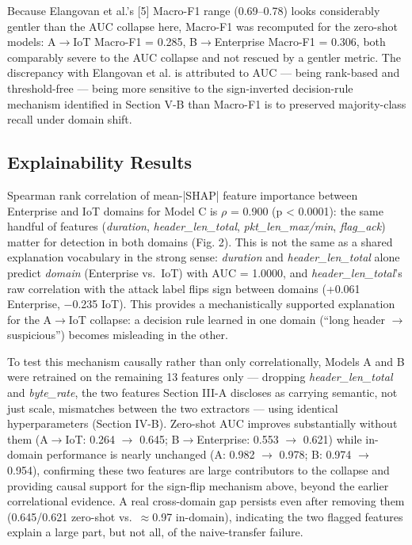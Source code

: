 \documentclass[conference]{IEEEtran}
\begin{document}
Because Elangovan et al.'s [5] Macro-F1 range (0.69--0.78) looks considerably gentler than the AUC collapse here, Macro-F1 was recomputed for the zero-shot models: A$\rightarrow$IoT Macro-F1 = 0.285, B$\rightarrow$Enterprise Macro-F1 = 0.306, both comparably severe to the AUC collapse and not rescued by a gentler metric. The discrepancy with Elangovan et al. is attributed to AUC --- being rank-based and threshold-free --- being more sensitive to the sign-inverted decision-rule mechanism identified in Section V-B than Macro-F1 is to preserved majority-class recall under domain shift.

\subsection{Explainability Results}

Spearman rank correlation of mean-|SHAP| feature importance between Enterprise and IoT domains for Model C is $\rho$ = 0.900 (p < 0.0001): the same handful of features (\textit{duration}, \textit{header\_len\_total}, \textit{pkt\_len\_max/min}, \textit{flag\_ack}) matter for detection in both domains (Fig. 2). This is not the same as a shared explanation vocabulary in the strong sense: \textit{duration} and \textit{header\_len\_total} alone predict \textit{domain} (Enterprise vs.~IoT) with AUC = 1.0000, and \textit{header\_len\_total}'s raw correlation with the attack label flips sign between domains (+0.061 Enterprise, $-$0.235 IoT). This provides a mechanistically supported explanation for the A$\rightarrow$IoT collapse: a decision rule learned in one domain (``long header $\rightarrow$ suspicious'') becomes misleading in the other.

To test this mechanism causally rather than only correlationally, Models A and B were retrained on the remaining 13 features only --- dropping \textit{header\_len\_total} and \textit{byte\_rate}, the two features Section III-A discloses as carrying semantic, not just scale, mismatches between the two extractors --- using identical hyperparameters (Section IV-B). Zero-shot AUC improves substantially without them (A$\rightarrow$IoT: 0.264 $\rightarrow$ 0.645; B$\rightarrow$Enterprise: 0.553 $\rightarrow$ 0.621) while in-domain performance is nearly unchanged (A: 0.982 $\rightarrow$ 0.978; B: 0.974 $\rightarrow$ 0.954), confirming these two features are large contributors to the collapse and providing causal support for the sign-flip mechanism above, beyond the earlier correlational evidence. A real cross-domain gap persists even after removing them (0.645/0.621 zero-shot vs.~$\approx$0.97 in-domain), indicating the two flagged features explain a large part, but not all, of the naive-transfer failure.
\end{document}
